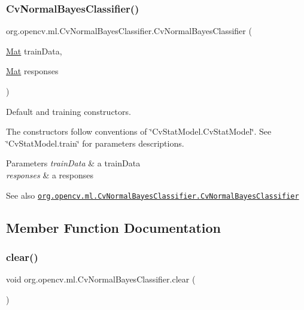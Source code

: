 \subsubsection{\texorpdfstring{Cv\+Normal\+Bayes\+Classifier()}{CvNormalBayesClassifier()}\hspace{0.1cm}{\footnotesize\ttfamily [4/4]}}
{\footnotesize\ttfamily org.\+opencv.\+ml.\+Cv\+Normal\+Bayes\+Classifier.\+Cv\+Normal\+Bayes\+Classifier (\begin{DoxyParamCaption}\item[{\mbox{\hyperlink{classorg_1_1opencv_1_1core_1_1_mat}{Mat}}}]{train\+Data,  }\item[{\mbox{\hyperlink{classorg_1_1opencv_1_1core_1_1_mat}{Mat}}}]{responses }\end{DoxyParamCaption})}

Default and training constructors.

The constructors follow conventions of \char`\"{}\+Cv\+Stat\+Model.\+Cv\+Stat\+Model\char`\"{}. See \char`\"{}\+Cv\+Stat\+Model.\+train\char`\"{} for parameters descriptions.


\begin{DoxyParams}{Parameters}
{\em train\+Data} & a train\+Data \\
\hline
{\em responses} & a responses\\
\hline
\end{DoxyParams}
\begin{DoxySeeAlso}{See also}
\href{http://docs.opencv.org/modules/ml/doc/normal_bayes_classifier.html#cvnormalbayesclassifier-cvnormalbayesclassifier}{\tt org.\+opencv.\+ml.\+Cv\+Normal\+Bayes\+Classifier.\+Cv\+Normal\+Bayes\+Classifier} 
\end{DoxySeeAlso}


\subsection{Member Function Documentation}
\mbox{\label{classorg_1_1opencv_1_1ml_1_1_cv_normal_bayes_classifier_a87af297ad4ac9585a3a5c7ae25934058}} 
\subsubsection{\texorpdfstring{clear()}{clear()}}
{\footnotesize\ttfamily void org.\+opencv.\+ml.\+Cv\+Normal\+Bayes\+Classifier.\+clear (\begin{DoxyParamCaption}{ }\end{DoxyParamCaption})}

